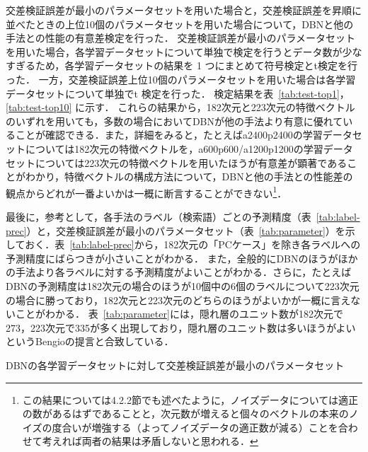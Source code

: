 \documentclass[japanese]{jnlp_1.4}
\begin{document}
交差検証誤差が最小のパラメータセットを用いた場合と，交差検証誤差を昇順に並べたときの上位10個のパラメータセットを用いた場合について，DBNと他の手法との性能の有意差検定を行った．
交差検証誤差が最小のパラメータセットを用いた場合，各学習データセットについて単独で検定を行うとデータ数が少なすぎるため，各学習データセットの結果を 1 つにまとめて符号検定とt検定を行った．
一方，交差検証誤差上位10個のパラメータセットを用いた場合は各学習データセットについて単独でt
検定を行った．
検定結果を表~\ref{tab:test-top1}，\ref{tab:test-top10} に示す．
これらの結果から，182次元と223次元の特徴ベクトルのいずれを用いても，多数の場合においてDBNが他の手法より有意に優れていることが確認できる．また，詳細をみると，たとえばa2400p2400の学習データセットについては182次元の特徴ベクトルを，a600p600/a1200p1200の学習データセットについては223次元の特徴ベクトルを用いたほうが有意差が顕著であることがわかり，特徴ベクトルの構成方法について，DBNと他の手法との性能差の観点からどれが一番よいかは一概に断言することができない\footnote{この結果については4.2.2節でも述べたように，ノイズデータについては適正の数があるはずであることと，次元数が増えると個々のベクトルの本来のノイズの度合いが増強する（よってノイズデータの適正数が減る）ことを合わせて考えれば両者の結果は矛盾しないと思われる．}．

\begin{table}[t]
\label{tab:label-prec}

\end{table}

最後に，参考として，各手法のラベル（検索語）ごとの予測精度（表~\ref{tab:label-prec}）と，交差検証誤差が最小のパラメータセット（表~\ref{tab:parameter}）を示しておく．表~\ref{tab:label-prec}から，182次元の「PCケース」を除き各ラベルへの予測精度にばらつきが小さいことがわかる．
また，全般的にDBNのほうがほかの手法より各ラベルに対する予測精度がよいことがわかる．さらに，たとえばDBNの予測精度は182次元の場合のほうが10個中の6個のラベルについて223次元の場合に勝っており，182次元と223次元のどちらのほうがよいかが一概に言えないことがわかる．
表~\ref{tab:parameter}には，隠れ層のユニット数が182次元で273，223次元で335が多く出現しており，隠れ層のユニット数は多いほうがよいというBengioの提言と合致している．

\begin{table}[t]
\caption{DBNの各学習データセットに対して交差検証誤差が最小のパラメータセット}
\label{tab:parameter}

\end{table}
\end{document}
